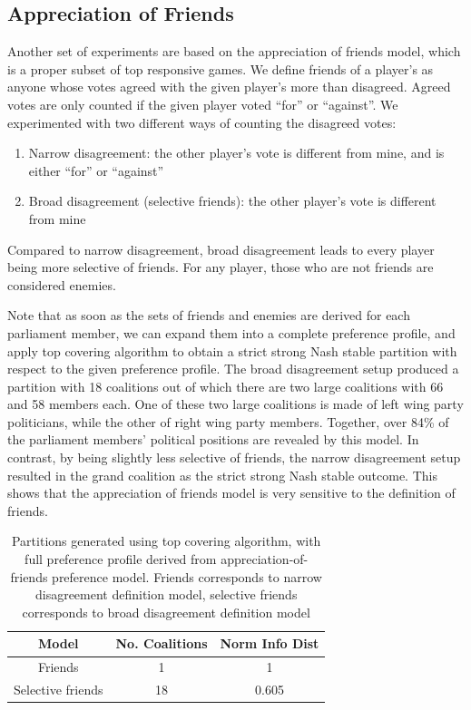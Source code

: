 \documentclass[letterpaper]{article} %
\theoremstyle{definition}
\begin{document}
\subsection{Appreciation of Friends}
Another set of experiments are based on the appreciation of friends model, which is a proper subset of top responsive games. We define friends of a player's as anyone whose votes agreed with the given player's more than disagreed. Agreed votes are only counted if the given player voted ``for'' or ``against''. We experimented with two different ways of counting the disagreed votes:

\begin{enumerate}
  \item Narrow disagreement: the other player's vote is different from mine, and is either ``for'' or ``against''
  \item Broad disagreement (selective friends): the other player's vote is different from mine
\end{enumerate}

Compared to narrow disagreement, broad disagreement leads to every player being more selective of friends. For any player, those who are not friends are considered enemies.

Note that as soon as the sets of friends and enemies are derived for each parliament member, we can expand them into a complete preference profile, and apply top covering algorithm to obtain a strict strong Nash stable partition with respect to the given preference profile. The broad disagreement setup produced a partition with 18 coalitions out of which there are two large coalitions with 66 and 58 members each. One of these two large coalitions is made of left wing party politicians, while the other of right wing party members. Together, over 84\% of the parliament members' political positions are revealed by this model. In contrast, by being slightly less selective of friends, the narrow disagreement setup resulted in the grand coalition as the strict strong Nash stable outcome. This shows that the appreciation of friends model is very sensitive to the definition of friends.

\begin{table}[h!]
\centering
\begin{tabular}{c|c|c}
\hline
Model & No. Coalitions & Norm Info Dist \\
\hline
Friends & 1 & 1 \\
Selective friends & 18 & 0.605 \\
\hline
\end{tabular}
\caption{Partitions generated using top covering algorithm, with full preference profile derived from appreciation-of-friends preference model. Friends corresponds to narrow disagreement definition model, selective friends corresponds to broad disagreement definition model}
\label{table:friends_models}
\end{table}
\end{document}
